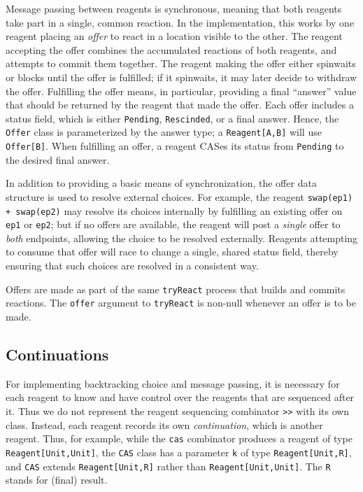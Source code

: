 \documentclass[preprint,nocopyrightspace]{sigplanconf}
\begin{document}
Message passing between reagents is synchronous, meaning that both reagents take
part in a single, common reaction.  In the implementation, this works by one
reagent placing an \emph{offer} to react in a location visible to the other.
The reagent accepting the offer combines the accumulated reactions of both
reagents, and attempts to commit them together.  The reagent making the offer
either spinwaits or blocks until the offer is fulfilled; if it spinwaits, it may
later decide to withdraw the offer.  Fulfilling the offer means, in particular,
providing a final ``answer'' value that should be returned by the reagent that
made the offer.  Each offer includes a status field, which is either
\lstinline{Pending}, \lstinline{Rescinded}, or a final answer.  Hence, the
\lstinline{Offer} class is parameterized by the answer type; a
\lstinline{Reagent[A,B]} will use \lstinline{Offer[B]}.  When fulfilling an
offer, a reagent CASes its status from \lstinline{Pending} to the desired final
answer.

In addition to providing a basic means of synchronization, the offer data
structure is used to resolve external choices.  For example, the reagent
\lstinline{swap(ep1) + swap(ep2)} may resolve its choices internally by
fulfilling an existing offer on \lstinline{ep1} or \lstinline{ep2}; but if no
offers are available, the reagent will post a \emph{single} offer to \emph{both}
endpoints, allowing the choice to be resolved externally.  Reagents attempting
to consume that offer will race to change a single, shared status field, thereby
ensuring that such choices are resolved in a consistent way.

Offers are made as part of the same \lstinline{tryReact} process that builds and
commits reactions.  The \lstinline{offer} argument to \lstinline{tryReact} is
non-null whenever an offer is to be made.


\subsection{Continuations}

For implementing backtracking choice and message passing, it is necessary for
each reagent to know and have control over the reagents that are sequenced after
it.  Thus we do not represent the reagent sequencing combinator \lstinline{>>}
with its own class.  Instead, each reagent records its own \emph{continuation},
which is another reagent.  Thus, for example, while the \lstinline{cas}
combinator produces a reagent of type \lstinline{Reagent[Unit,Unit]}, the
\lstinline{CAS} class has a parameter \lstinline{k} of type
\lstinline{Reagent[Unit,R]}, and \lstinline{CAS} extends
\lstinline{Reagent[Unit,R]} rather than \lstinline{Reagent[Unit,Unit]}.  The
\lstinline{R} stands for (final) result.  
\end{document}

